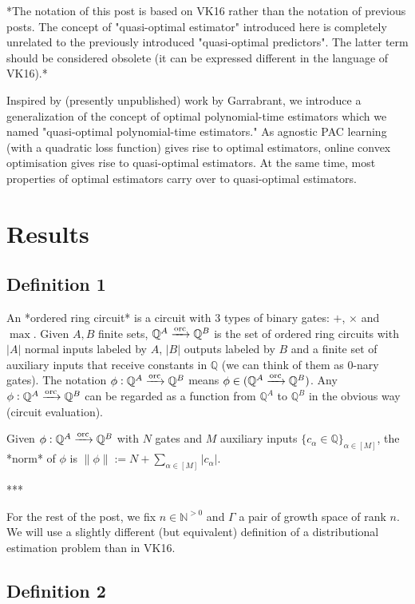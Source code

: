 \documentclass[a4paper]{article}
\newcommand{\Nats}{\mathbb{N}}
\newcommand{\Rats}{\mathbb{Q}}
\newcommand{\Abs}[1]{\lvert #1 \rvert}
\newcommand{\Norm}[1]{\lVert #1 \rVert}
\newcommand{\ORC}{\xrightarrow{\textnormal{orc}}}
\begin{document}
*The notation of this post is based on VK16 rather than the notation of previous posts. The concept of "quasi-optimal estimator" introduced here is completely unrelated to the previously introduced "quasi-optimal predictors". The latter term should be considered obsolete (it can be expressed different in the language of VK16).*

Inspired by (presently unpublished) work by Garrabrant, we introduce a generalization of the concept of optimal polynomial-time estimators which we named "quasi-optimal polynomial-time estimators." As agnostic PAC learning (with a quadratic loss function) gives rise to optimal estimators, online convex optimisation gives rise to quasi-optimal estimators. At the same time, most properties of optimal estimators carry over to quasi-optimal estimators.

\section{Results}

\subsection{Definition 1}

An *ordered ring circuit* is a circuit with 3 types of binary gates: ${+}$, ${\times}$ and ${\max}$. Given ${A,B}$ finite sets, ${\Rats^A \ORC \Rats^B}$ is the set of ordered ring circuits with $\Abs{A}$ normal inputs labeled by ${A}$, ${\Abs{B}}$ outputs labeled by ${B}$ and a finite set of auxiliary inputs that receive constants in ${\Rats}$ (we can think of them as 0-nary gates). The notation ${\phi: \Rats^A \ORC \Rats^B}$ means ${\phi \in (\Rats^A \ORC \Rats^B)}$. Any ${\phi: \Rats^A \ORC \Rats^B}$ can be regarded as a function from ${\Rats^A}$ to ${\Rats^B}$ in the obvious way (circuit evaluation). 

Given ${\phi: \Rats^A \ORC \Rats^B}$ with ${N}$ gates and ${M}$ auxiliary inputs ${\{c_\alpha \in \Rats\}_{\alpha \in [M]}}$, the *norm* of ${\phi}$ is ${\Norm{\phi}:=N+\sum_{\alpha \in [M]} \Abs{c_\alpha}}$.

***

For the rest of the post, we fix ${n \in \Nats^{>0}}$ and ${\Gamma}$ a pair of growth space of rank ${n}$. We will use a slightly different (but equivalent) definition of a distributional estimation problem than in VK16.

\subsection{Definition 2}
\end{document}
